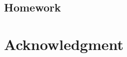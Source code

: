\documentclass[conference,compsoc]{IEEEtran}
\begin{document}
	\subsection{Homework}

\section*{Acknowledgment}





\end{document}
